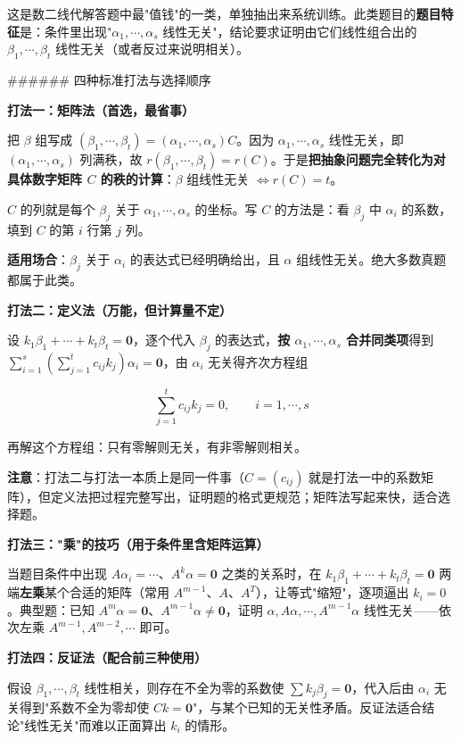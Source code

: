 \documentclass[11pt,openany,UTF8]{ctexbook}
\begin{document}
这是数二线代解答题中最"值钱"的一类，单独抽出来系统训练。此类题目的\textbf{题目特征}是：条件里出现"$\alpha_1,\cdots,\alpha_s$ 线性无关"，结论要求证明由它们线性组合出的 $\beta_1,\cdots,\beta_t$ 线性无关（或者反过来说明相关）。

\#\#\#\#\#\# 四种标准打法与选择顺序

\textbf{打法一：矩阵法（首选，最省事）}

把 $\beta$ 组写成 $(\beta_1,\cdots,\beta_t)=(\alpha_1,\cdots,\alpha_s)C$。因为 $\alpha_1,\cdots,\alpha_s$ 线性无关，即 $(\alpha_1,\cdots,\alpha_s)$ 列满秩，故 $r(\beta_1,\cdots,\beta_t)=r(C)$。于是\textbf{把抽象问题完全转化为对具体数字矩阵 $C$ 的秩的计算}：$\beta$ 组线性无关 $\iff r(C)=t$。

$C$ 的列就是每个 $\beta_j$ 关于 $\alpha_1,\cdots,\alpha_s$ 的坐标。写 $C$ 的方法是：看 $\beta_j$ 中 $\alpha_i$ 的系数，填到 $C$ 的第 $i$ 行第 $j$ 列。

\textbf{适用场合}：$\beta_j$ 关于 $\alpha_i$ 的表达式已经明确给出，且 $\alpha$ 组线性无关。绝大多数真题都属于此类。

\textbf{打法二：定义法（万能，但计算量不定）}

设 $k_1\beta_1+\cdots+k_t\beta_t=\mathbf{0}$，逐个代入 $\beta_j$ 的表达式，\textbf{按 $\alpha_1,\cdots,\alpha_s$ 合并同类项}得到 $\sum_{i=1}^{s}\left(\sum_{j=1}^{t}c_{ij}k_j\right)\alpha_i=\mathbf{0}$，由 $\alpha_i$ 无关得齐次方程组

\[\sum_{j=1}^{t}c_{ij}k_j=0,\qquad i=1,\cdots,s\]

再解这个方程组：只有零解则无关，有非零解则相关。

\textbf{注意}：打法二与打法一本质上是同一件事（$C=(c_{ij})$ 就是打法一中的系数矩阵），但定义法把过程完整写出，证明题的格式更规范；矩阵法写起来快，适合选择题。

\textbf{打法三："乘"的技巧（用于条件里含矩阵运算）}

当题目条件中出现 $A\alpha_i=\cdots$、$A^k\alpha=\mathbf{0}$ 之类的关系时，在 $k_1\beta_1+\cdots+k_t\beta_t=\mathbf{0}$ 两端\textbf{左乘}某个合适的矩阵（常用 $A^{m-1}$、$A$、$A^T$），让等式"缩短"，逐项逼出 $k_i=0$。典型题：已知 $A^{m}\alpha=\mathbf{0}$、$A^{m-1}\alpha\neq\mathbf{0}$，证明 $\alpha,A\alpha,\cdots,A^{m-1}\alpha$ 线性无关——依次左乘 $A^{m-1},A^{m-2},\cdots$ 即可。

\textbf{打法四：反证法（配合前三种使用）}

假设 $\beta_1,\cdots,\beta_t$ 线性相关，则存在不全为零的系数使 $\sum k_j\beta_j=\mathbf{0}$，代入后由 $\alpha_i$ 无关得到"系数不全为零却使 $Ck=\mathbf{0}$"，与某个已知的无关性矛盾。反证法适合结论"线性无关"而难以正面算出 $k_i$ 的情形。
\end{document}
